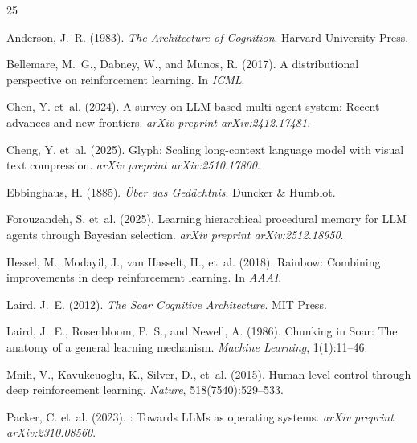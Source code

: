 \documentclass[letterpaper]{article}
\begin{document}


\begin{thebibliography}{25}

Anderson, J.~R. (1983).
\newblock \emph{The Architecture of Cognition}.
\newblock Harvard University Press.

Bellemare, M.~G., Dabney, W., and Munos, R. (2017).
\newblock A distributional perspective on reinforcement learning.
\newblock In \emph{ICML}.

Chen, Y. et~al. (2024).
\newblock A survey on {LLM}-based multi-agent system: Recent advances and new frontiers.
\newblock \emph{arXiv preprint arXiv:2412.17481}.

Cheng, Y. et~al. (2025).
\newblock Glyph: Scaling long-context language model with visual text compression.
\newblock \emph{arXiv preprint arXiv:2510.17800}.

Ebbinghaus, H. (1885).
\newblock \emph{{\"U}ber das Ged{\"a}chtnis}.
\newblock Duncker \& Humblot.

Forouzandeh, S. et~al. (2025).
\newblock Learning hierarchical procedural memory for {LLM} agents through {B}ayesian selection.
\newblock \emph{arXiv preprint arXiv:2512.18950}.

Hessel, M., Modayil, J., van Hasselt, H., et~al. (2018).
\newblock Rainbow: Combining improvements in deep reinforcement learning.
\newblock In \emph{AAAI}.

Laird, J.~E. (2012).
\newblock \emph{The Soar Cognitive Architecture}.
\newblock MIT Press.

Laird, J.~E., Rosenbloom, P.~S., and Newell, A. (1986).
\newblock Chunking in {S}oar: The anatomy of a general learning mechanism.
\newblock \emph{Machine Learning}, 1(1):11--46.

Mnih, V., Kavukcuoglu, K., Silver, D., et~al. (2015).
\newblock Human-level control through deep reinforcement learning.
\newblock \emph{Nature}, 518(7540):529--533.

Packer, C. et~al. (2023).
: Towards {LLM}s as operating systems.
\newblock \emph{arXiv preprint arXiv:2310.08560}.


\end{thebibliography}
\end{document}
